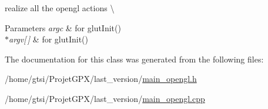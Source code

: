 realize all the opengl actions \textbackslash{} 


\begin{DoxyParams}{Parameters}
{\em argc} & for glut\+Init() \\
\hline
{\em $\ast$argv\mbox{[}$\,$\mbox{]}} & for glut\+Init() \\
\hline
\end{DoxyParams}


The documentation for this class was generated from the following files\+:\begin{DoxyCompactItemize}
\item 
/home/gtsi/\+Projet\+G\+P\+X/last\+\_\+version/\hyperlink{main__opengl_8h}{main\+\_\+opengl.\+h}\item 
/home/gtsi/\+Projet\+G\+P\+X/last\+\_\+version/\hyperlink{main__opengl_8cpp}{main\+\_\+opengl.\+cpp}\end{DoxyCompactItemize}
